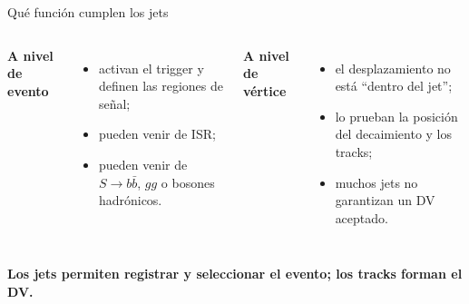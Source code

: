 \documentclass[aspectratio=169,10pt]{beamer}
\begin{document}
\begin{frame}{Qué función cumplen los jets}
  \begin{columns}[T]
      \textbf{A nivel de evento}
      \begin{itemize}
        \item activan el trigger y definen las regiones de señal;
        \item pueden venir de ISR;
        \item pueden venir de $S\to b\bar b$, $gg$ o bosones hadrónicos.
      \end{itemize}
      \textbf{A nivel de vértice}
      \begin{itemize}
        \item el desplazamiento no está ``dentro del jet'';
        \item lo prueban la posición del decaimiento y los tracks;
        \item muchos jets no garantizan un DV aceptado.
      \end{itemize}
  \end{columns}
  \vspace{1.2em}
  \centering\Large\textbf{Los jets permiten registrar y seleccionar el evento; los tracks forman el DV.}
\end{frame}
\end{document}
